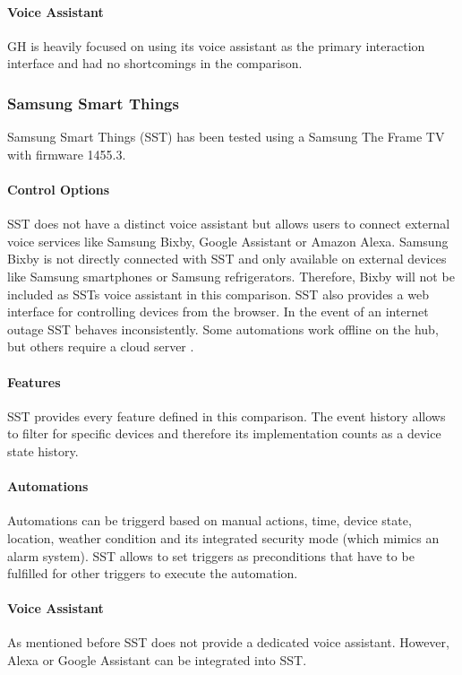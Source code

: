 \paragraph{Voice Assistant}
GH is heavily focused on using its voice assistant as the primary interaction interface and had no shortcomings in the comparison.

\newpage
\subsubsection{Samsung Smart Things}
Samsung Smart Things (SST) has been tested using a Samsung The Frame TV with firmware 1455.3.

\paragraph{Control Options}
SST does not have a distinct voice assistant but allows users to connect external voice services like Samsung Bixby, Google Assistant or Amazon Alexa. Samsung Bixby is not directly connected with SST and only available on external devices like Samsung smartphones or Samsung refrigerators. Therefore, Bixby will not be included as SSTs voice assistant in this comparison.
SST also provides a web interface for controlling devices from the browser. In the event of an internet outage SST behaves inconsistently. Some automations work offline on the hub, but others require a cloud server \cite{Reddit_r/SmartThings2024OfflineMode}.

\paragraph{Features}
SST provides every feature defined in this comparison. The event history allows to filter for specific devices and therefore its implementation counts as a device state history.

\paragraph{Automations}
Automations can be triggerd based on manual actions, time, device state, location, weather condition and its integrated security mode (which mimics an alarm system). SST allows to set triggers as preconditions that have to be fulfilled for other triggers to execute the automation.

\paragraph{Voice Assistant}
As mentioned before SST does not provide a dedicated voice assistant. However, Alexa or Google Assistant can be integrated into SST.

